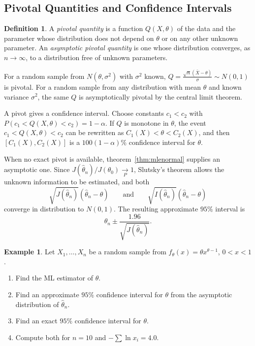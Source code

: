 \documentclass[12pt,a4paper]{report}
\theoremstyle{definition}
\newtheorem{defn}[thm]{Definition}
\newtheorem{exa}[thm]{Example}
\begin{document}
\subsection{Pivotal Quantities and Confidence Intervals}

\begin{defn}
\label{def:pivot}
A \emph{pivotal quantity} is a function $Q(X, \theta)$ of the data and the parameter
whose distribution does not depend on $\theta$ or on any other unknown parameter. An
\emph{asymptotic pivotal quantity} is one whose distribution converges, as
$n\to\infty$, to a distribution free of unknown parameters.
\end{defn}

For a random sample from $N(\theta, \sigma^2)$ with $\sigma^2$ known,
$Q = \frac{\sqrt n(\bar X - \theta)}{\sigma}\sim N(0, 1)$ is pivotal. For a random sample
from any distribution with mean $\theta$ and known variance $\sigma^2$, the same $Q$ is
asymptotically pivotal by the central limit theorem.

A pivot gives a confidence interval. Choose constants $c_1<c_2$ with
$P\left(c_1<Q(X, \theta)<c_2\right) = 1 - \alpha$. If $Q$ is monotone in $\theta$, the
event $c_1<Q(X, \theta)<c_2$ can be rewritten as $C_1(X)<\theta<C_2(X)$, and then
$\left[C_1(X), C_2(X)\right]$ is a $100(1 - \alpha)\%$ confidence interval for $\theta$.

When no exact pivot is available, theorem~\ref{thm:mlenormal} supplies an
asymptotic one. Since $J(\hat\theta_n)/J(\theta_0)\underset{P}{\longrightarrow}1$, Slutsky's
theorem allows the unknown information to be estimated, and both
\[\sqrt{J(\hat\theta_n)}\left(\hat\theta_n - \theta\right)\qquad\text{and}\qquad
\sqrt{I(\hat\theta_n)}\left(\hat\theta_n - \theta\right)\]
converge in distribution to $N(0, 1)$. The resulting approximate $95\%$ interval is
\[\hat\theta_n\pm\frac{1.96}{\sqrt{J(\hat\theta_n)}} .\]

\begin{exa}
\label{ex:powerci}
Let $X_1, \dots, X_n$ be a random sample from $f_\theta(x) = \theta x^{\theta - 1}$,
$0<x<1$.
\begin{enumerate}
\item[(a)] Find the ML estimator of $\theta$.
\item[(b)] Find an approximate $95\%$ confidence interval for $\theta$ from the
asymptotic distribution of $\hat\theta_n$.
\item[(c)] Find an exact $95\%$ confidence interval for $\theta$.
\item[(d)] Compute both for $n = 10$ and $-\sum\ln x_i = 4.0$.
\end{enumerate}
\end{exa}
\end{document}
